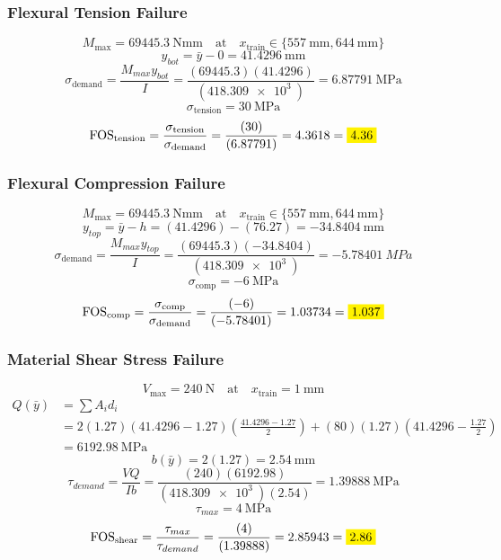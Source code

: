 \documentclass[11pt, fleqn]{article}
\newcommand{\mathhl}[1]{\colorbox{yellow}{$\displaystyle #1$}}
\begin{document}
\subsubsection{Flexural Tension Failure}
\[ M_{\mathrm{max}} = \SI{69445.3}{\N\mm} \quad \text{at} \quad x_{\mathrm{train}} \in \{\SI{557}{\mm},\SI{644}{\mm}\} \]
\[ y_{bot} = \bar{y}-0 = \SI{41.4296}{\mm} \]
\[ \sigma_{\mathrm{demand}} = \frac{M_{max}y_{bot}}{I} = \frac{(69445.3)(41.4296)}{(\SI{418.309e3}{})} = \SI{6.87791}{\MPa} \]
\[ \sigma_{\mathrm{tension}} = \SI{30}{\MPa} \]
\[ {\mathrm{FOS}}_{\mathrm{tension}} = \frac{\sigma_{\mathrm{tension}}}{\sigma_{\mathrm{demand}}} = \frac{(30)}{(6.87791)} = 4.3618 = \mathhl{4.36} \]

\subsubsection{Flexural Compression Failure}
\[ M_{\mathrm{max}} = \SI{69445.3}{\N\mm} \quad \text{at} \quad x_{\mathrm{train}} \in \{\SI{557}{\mm},\SI{644}{\mm}\} \]
\[ y_{top} = \bar{y}-h = (41.4296)-(76.27) = \SI{-34.8404}{\mm} \]
\[ \sigma_{\mathrm{demand}} = \frac{M_{max}y_{top}}{I} = \frac{(69445.3)(-34.8404)}{(\SI{418.309e3}{})} = \SI{-5.78401}{MPa} \]
\[ \sigma_{\mathrm{comp}} = \SI{-6}{\MPa} \]
\[ {\mathrm{FOS}}_{\mathrm{comp}} = \frac{\sigma_{\mathrm{comp}}}{\sigma_{\mathrm{demand}}} = \frac{(-6)}{(-5.78401)} = 1.03734 = \mathhl{1.037} \]

\subsubsection{Material Shear Stress Failure}
\[ V_{\mathrm{max}} = \SI{240}{\N} \quad \text{at} \quad x_{\mathrm{train}} = \SI{1}{\mm} \]
\begin{align*}
    Q(\bar{y}) & = \sum{A_id_i}                                                                                           \\
               & = 2(1.27)(41.4296-1.27)\left(\frac{41.4296-1.27}{2}\right)+(80)(1.27)\left(41.4296-\frac{1.27}{2}\right) \\
               & = \SI{6192.98}{\MPa}
\end{align*}
\[ b(\bar{y}) = 2(1.27) = \SI{2.54}{\mm} \]
\[ \tau_{demand} = \frac{VQ}{Ib} = \frac{(240)(6192.98)}{(\SI{418.309e3}{})(2.54)} = \SI{1.39888}{\MPa} \]
\[ \tau_{max} = \SI{4}{\MPa} \]
\[ {\mathrm{FOS}}_{\mathrm{shear}} = \frac{\tau_{max}}{\tau_{demand}} = \frac{(4)}{(1.39888)} = 2.85943 = \mathhl{2.86} \]
\end{document}
